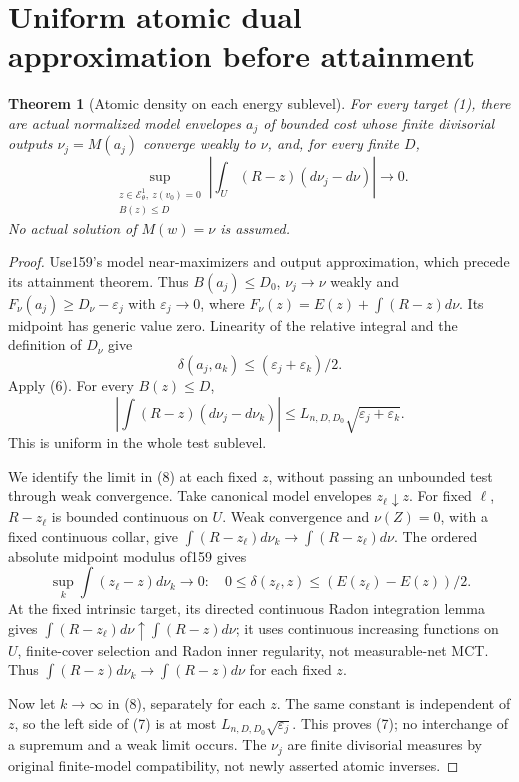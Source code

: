 \documentclass[11pt]{article}
\newtheorem{theorem}{Theorem}
\newcommand{\EE}{\mathcal E^1_\theta}
\begin{document}
\section{Uniform atomic dual approximation before attainment}
\begin{theorem}[Atomic density on each energy sublevel]\label{density}
For every target (1), there are actual normalized model envelopes
$a_j$ of bounded cost whose finite divisorial outputs $\nu_j=M(a_j)$
converge weakly to $\nu$, and, for every finite $D$,
\[
 \sup_{\substack{z\in\EE,\ z(v_0)=0\\B(z)\leq D}}
 \left|\int_U(R-z)(d\nu_j-d\nu)\right|\longrightarrow0.
                                                        \tag{7}
\]
No actual solution of $M(w)=\nu$ is assumed.
\end{theorem}
\begin{proof}
Use159's model near-maximizers and output approximation,
which precede its attainment theorem. Thus $B(a_j)\leq D_0$,
$\nu_j\to\nu$ weakly and
$F_\nu(a_j)\geq D_\nu-\varepsilon_j$ with $\varepsilon_j\to0$,
where $F_\nu(z)=E(z)+\int(R-z)d\nu$.
Its midpoint has generic value zero. Linearity of the relative
integral and the definition of $D_\nu$ give
\[
 \delta(a_j,a_k)\leq(\varepsilon_j+\varepsilon_k)/2.
\]
Apply (6). For every $B(z)\leq D$,
\[
 \left|\int(R-z)(d\nu_j-d\nu_k)\right|
       \leq L_{n,D,D_0}\sqrt{\varepsilon_j+\varepsilon_k}.
                                                        \tag{8}
\]
This is uniform in the whole test sublevel.

We identify the limit in (8) at each fixed $z$, without passing an
unbounded test through weak convergence.
Take canonical model envelopes $z_\ell\downarrow z$.
For fixed $\ell$, $R-z_\ell$ is bounded continuous on $U$.
Weak convergence and $\nu(Z)=0$, with a fixed continuous collar,
give $\int(R-z_\ell)d\nu_k\to\int(R-z_\ell)d\nu$.
The ordered absolute midpoint modulus of159 gives
\[
 \sup_k\int(z_\ell-z)d\nu_k\longrightarrow0:
 \quad
 0\leq\delta(z_\ell,z)\leq(E(z_\ell)-E(z))/2.
\]
At the fixed intrinsic target, its directed continuous Radon
integration lemma gives
$\int(R-z_\ell)d\nu\uparrow\int(R-z)d\nu$;
it uses continuous increasing functions on $U$, finite-cover
selection and Radon inner regularity, not measurable-net MCT.
Thus $\int(R-z)d\nu_k\to\int(R-z)d\nu$ for each fixed $z$.

Now let $k\to\infty$ in (8), separately for each $z$.
The same constant is independent of $z$, so
the left side of (7) is at most
$L_{n,D,D_0}\sqrt{\varepsilon_j}$.
This proves (7); no interchange of a supremum and a weak limit occurs.
The $\nu_j$ are finite divisorial measures by original finite-model
compatibility, not newly asserted atomic inverses.
\end{proof}
\end{document}
